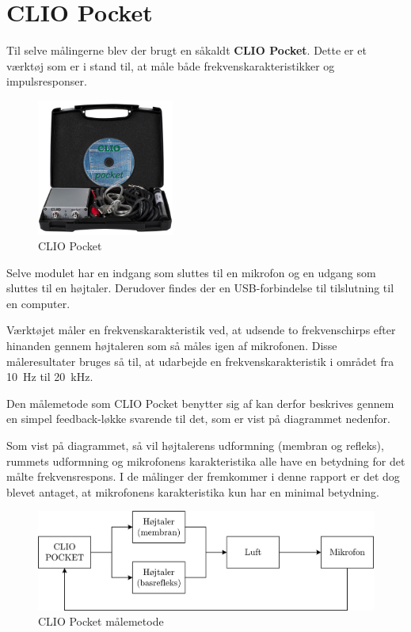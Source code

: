 \section{CLIO Pocket}
Til selve målingerne blev der brugt en såkaldt \textbf{CLIO Pocket}. Dette er et værktøj som er i stand til, at måle både frekvenskarakteristikker og impulsresponser.

\begin{figure} 
	\vspace{-20pt}
	\begin{center}
		\includegraphics[width=0.4\textwidth]{Billeder/ClioPocket}
	\end{center}
	\caption{CLIO Pocket}
	\vspace{-20pt}
\end{figure}
Selve modulet har en indgang som sluttes til en mikrofon og en udgang som sluttes til en højtaler. Derudover findes der en USB-forbindelse til tilslutning til en computer.

Værktøjet måler en frekvenskarakteristik ved, at udsende to frekvenschirps efter hinanden gennem højtaleren som så måles igen af mikrofonen. Disse måleresultater bruges så til, at udarbejde en frekvenskarakteristik i området fra \SI{10}{\hertz} til \SI{20}{\kilo\hertz}.

Den målemetode som CLIO Pocket benytter sig af kan derfor beskrives gennem en simpel feedback-løkke svarende til det, som er vist på diagrammet nedenfor.

Som vist på diagrammet, så vil højtalerens udformning (membran og refleks), rummets udformning og mikrofonens karakteristika alle have en betydning for det målte frekvensrespons. I de målinger der fremkommer i denne rapport er det dog blevet antaget, at mikrofonens karakteristika kun har en minimal betydning. 

\begin{figure}[H]
	\centering
	\includegraphics[width=\textwidth]{Billeder/CLIOFeedback}
	\caption{CLIO Pocket målemetode}
	\label{fig:ClioFeedback}
\end{figure}